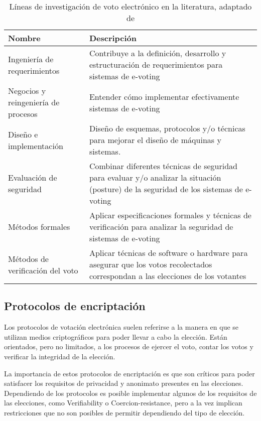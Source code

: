\begin{table}[h!]
\centering
\caption[Líneas de investigación de voto electrónico en la literatura]{Líneas de investigación de voto electrónico en la literatura, adaptado de  \cite{Al-Shammari2012}}
\label{tab:lineas-trabajo}
\begin{tabularx}{\textwidth}{>{\raggedright\arraybackslash}p{4cm} X} 
\toprule[1.5pt]
\bf 	Nombre							& \bf 	Descripción 	\\ \hline
	Ingeniería de requerimientos       		&	Contribuye a la definición, 
										desarrollo y estructuración de 
										requerimientos para sistemas 
										de e-voting	\\ 
	Negocios y reingeniería de procesos	&	Entender cómo implementar 
										efectivamente sistemas 
										de e-voting	\\ 
	Diseño e implementación			&	Diseño de esquemas, protocolos 
										y/o técnicas para mejorar el diseño 
										de máquinas y sistemas.	\\ 				
	Evaluación de seguridad				&	Combinar diferentes técnicas de 
										seguridad para evaluar y/o analizar 
										la situación (posture) de la 
										seguridad de los sistemas de 
										e-voting \\
	Métodos formales					&	Aplicar especificaciones formales 
										y técnicas de verificación para 
										analizar la seguridad de sistemas 
										de e-voting \\
	Métodos de verificación del voto		&	Aplicar técnicas de software o 
										hardware para asegurar que los 
										votos recolectados correspondan 
										a las elecciones de los votantes \\ 
					
\bottomrule[1.25pt]
\end {tabularx}
\end{table}

\newpage
\subsection{Protocolos de encriptación}

Los protocolos de votación electrónica suelen referirse a la manera
en que se utilizan medios criptográficos para poder llevar a cabo la elección.
Están orientados, pero no limitados, a los procesos de ejercer el voto, 
contar los votos y verificar la integridad de la elección. 

La importancia de estos protocolos de encriptación es que son críticos
para poder satisfacer los requisitos de privacidad y anonimato presentes 
en las elecciones. Dependiendo de los protocolos es posible implementar
algunos de los requisitos de las elecciones, como Verifiability o Coercion-resistance, 
pero a la vez implican restricciones que no son posibles de permitir dependiendo
del tipo de elección.

